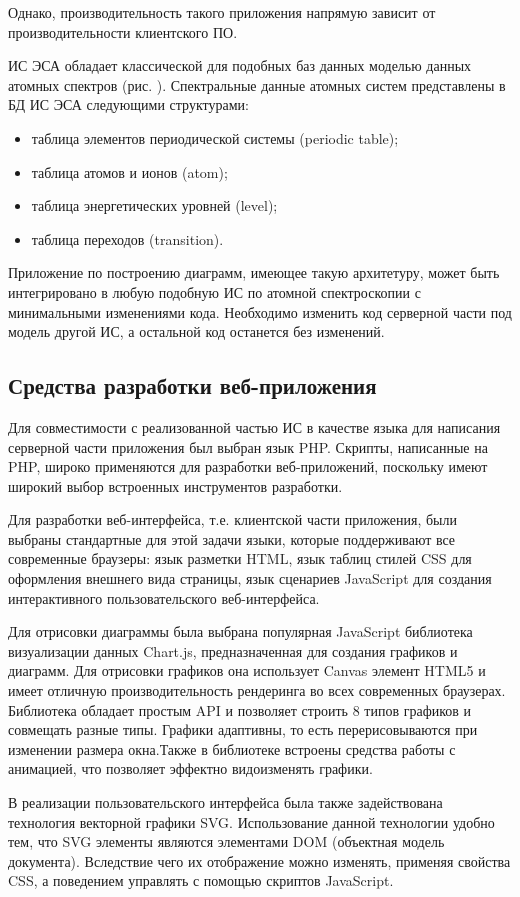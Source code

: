 \documentclass[a4paper, 12pt]{article}
\begin{document}
    Однако, производительность такого приложения напрямую зависит от производительности клиентского ПО.\par
    ИС ЭСА обладает классической для подобных баз данных моделью данных атомных спектров (рис. ). Спектральные данные атомных систем представлены в БД ИС ЭСА следующими структурами:
    \begin{itemize}
        \item таблица элементов периодической системы (periodic table);
        \item таблица атомов и ионов (atom);
        \item таблица энергетических уровней (level);
        \item таблица переходов (transition).
    \end{itemize}\par
    Приложение по построению диаграмм, имеющее такую архитетуру, может быть интегрировано в любую подобную ИС по атомной спектроскопии с минимальными изменениями кода. Необходимо изменить код серверной части под модель другой ИС, а остальной код останется без изменений.
    \subsection{Средства разработки веб-приложения}
    Для совместимости с реализованной частью ИС в качестве языка для написания серверной части приложения был выбран язык PHP. Скрипты, написанные на PHP, широко применяются для разработки веб-приложений, поскольку имеют широкий выбор встроенных инструментов разработки.\par
    Для разработки веб-интерфейса, т.е. клиентской части приложения, были выбраны стандартные для этой задачи языки, которые поддерживают все современные браузеры: язык разметки HTML, язык таблиц стилей CSS для оформления внешнего вида страницы, язык сценариев JavaScript для создания интерактивного пользовательского веб-интерфейса.\par
    Для отрисовки диаграммы была выбрана популярная JavaScript библиотека визуализации данных Chart.js, предназначенная для создания графиков и диаграмм. Для отрисовки графиков она использует Canvas элемент HTML5 и имеет отличную производительность рендеринга во всех современных браузерах. Библиотека обладает простым API и позволяет строить 8 типов графиков и совмещать разные типы. Графики адаптивны, то есть перерисовываются при изменении размера окна.Также в библиотеке встроены средства работы с анимацией, что позволяет эффектно видоизменять графики.\par
    В реализации пользовательского интерфейса была также задействована технология векторной графики SVG. Использование данной технологии удобно тем, что SVG элементы являются элементами DOM (объектная модель документа). 	Вследствие чего их отображение можно изменять, применяя свойства CSS, а поведением управлять с помощью скриптов JavaScript.
\end{document}
